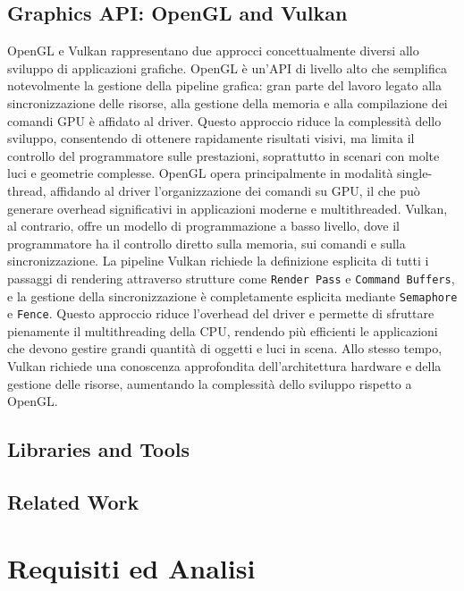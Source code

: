 \documentclass[12pt,a4paper,openright,twoside]{book}
\begin{document}
\section{Graphics API: OpenGL and Vulkan}
OpenGL e Vulkan rappresentano due approcci concettualmente diversi allo sviluppo di applicazioni grafiche.
OpenGL è un'API di livello alto che semplifica notevolmente la gestione della pipeline grafica: gran parte del lavoro
legato alla sincronizzazione delle risorse, alla gestione della memoria e alla compilazione dei comandi GPU è affidato
al driver. Questo approccio riduce la complessità dello sviluppo, consentendo di ottenere rapidamente risultati visivi,
ma limita il controllo del programmatore sulle prestazioni, soprattutto in scenari con molte luci e geometrie complesse.
OpenGL opera principalmente in modalità single-thread, affidando al driver l’organizzazione dei comandi su GPU, il che può
generare overhead significativi in applicazioni moderne e multithreaded.
Vulkan, al contrario, offre un modello di programmazione a basso livello, dove il programmatore ha il controllo diretto
sulla memoria, sui comandi e sulla sincronizzazione. La pipeline Vulkan richiede la definizione esplicita di tutti i
passaggi di rendering attraverso strutture come \texttt{Render Pass} e \texttt{Command Buffers}, e la gestione della 
sincronizzazione è completamente esplicita mediante \texttt{Semaphore} e \texttt{Fence}. Questo approccio riduce
l’overhead del driver e permette di sfruttare pienamente il multithreading della CPU, rendendo più efficienti
le applicazioni che devono gestire grandi quantità di oggetti e luci in scena. Allo stesso tempo, Vulkan richiede
una conoscenza approfondita dell’architettura hardware e della gestione delle risorse, aumentando la complessità
dello sviluppo rispetto a OpenGL.

\section{Libraries and Tools}

\section{Related Work}

\chapter{Requisiti ed Analisi}
\label{chap:analysis}
\end{document}
